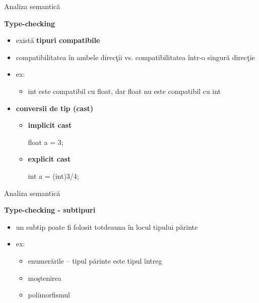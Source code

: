 \documentclass[pdf]{beamer}
\begin{document}
\begin{frame}{Analiza semantică}

\textbf{Type-checking}

\begin{itemize}
\item
există \textbf{tipuri compatibile}

\item
compatibilitatea în ambele direcţii vs. compatibilitatea într-o singură direcţie

\item
ex: 
\begin{itemize}
\item
int este compatibil cu float, dar float nu este compatibil cu int
\end{itemize}

\item
\textbf{conversii de tip (cast)}

\begin{itemize}
\item
\textbf{implicit cast}

float a = 3;
\newline

\item
\textbf{explicit cast}

int a = (int)3/4;
\end{itemize}
\end{itemize}
\end{frame}



\begin{frame}{Analiza semantică}

\textbf{Type-checking - subtipuri}

\begin{itemize}
\item
un subtip poate fi folosit totdeauna în locul tipului părinte

\item
ex: 

\begin{itemize}
\item
enumerările – tipul părinte este tipul întreg
\item
moştenirea
\item
polimorfismul
\end{itemize}
\end{itemize}
\end{frame}
\end{document}
